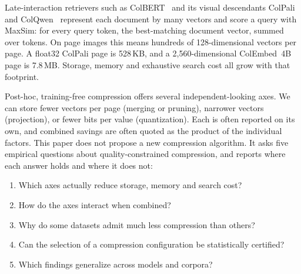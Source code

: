 \documentclass[conference]{IEEEtran}
\begin{document}
Late-interaction retrievers such as ColBERT~\cite{colbert,colbertv2} and its visual
descendants ColPali and ColQwen~\cite{colpali} represent each document by many vectors
and score a query with MaxSim: for every query token, the best-matching document vector,
summed over tokens. On page images this means hundreds of 128-dimensional vectors per
page. A float32 ColPali page is 528\,KB, and a 2,560-dimensional ColEmbed~4B page is
7.8\,MB. Storage, memory and exhaustive search cost all grow with that footprint.

Post-hoc, training-free compression offers several independent-looking axes. We can
store fewer vectors per page (merging or pruning), narrower vectors (projection), or
fewer bits per value (quantization). Each is often reported on its own, and combined
savings are often quoted as the product of the individual factors. This paper does not
propose a new compression algorithm. It asks five empirical questions about
quality-constrained compression, and reports where each answer holds and where it does
not:
\begin{enumerate}
\item Which axes actually reduce storage, memory and search cost?
\item How do the axes interact when combined?
\item Why do some datasets admit much less compression than others?
\item Can the selection of a compression configuration be statistically certified?
\item Which findings generalize across models and corpora?
\end{enumerate}
\end{document}
